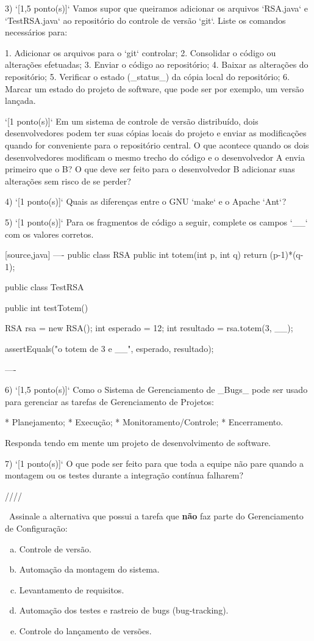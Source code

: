 3) `[1,5 ponto(s)]` Vamos supor que queiramos adicionar os arquivos
`RSA.java` e `TestRSA.java` ao repositório do controle de versão
`git`. Liste os comandos necessários para:

1. Adicionar os arquivos para o `git` controlar;
2. Consolidar o código ou alterações efetuadas;
3. Enviar o código ao repositório;
4. Baixar as alterações do repositório;
5. Verificar o estado (_status_) da cópia local do repositório;
6. Marcar um estado do projeto de software, que pode ser por exemplo,
   um versão lançada.


`[1 ponto(s)]` Em um sistema de controle de versão distribuído, dois
   desenvolvedores podem ter suas cópias locais do projeto e enviar
   as modificações quando for conveniente para o repositório central.
   O que acontece quando os dois desenvolvedores modificam o mesmo
   trecho do código e o desenvolvedor A envia primeiro que o B?
   O que deve ser feito para o desenvolvedor B adicionar suas
   alterações sem risco de se perder?

4) `[1 ponto(s)]` Quais as diferenças entre o GNU `make` e o Apache `Ant`?

5) `[1 ponto(s)]` Para os fragmentos de código a seguir, complete os campos
   `__` com os valores corretos.

[source,java]
----
public class RSA {
       public int totem(int p, int q) {
       	      return (p-1)*(q-1);
	}
}

public class TestRSA {
       public int testTotem() {
       	      RSA rsa = new RSA();
	      int esperado = 12;
	      int resultado = rsa.totem(3, __);

	      assertEquals("o totem de 3 e __", esperado, resultado);
       }
}
----

6) `[1,5 ponto(s)]` Como o Sistema de Gerenciamento de _Bugs_ pode ser usado
para gerenciar as tarefas de Gerenciamento de Projetos:

* Planejamento;
* Execução;
* Monitoramento/Controle;
* Encerramento.

Responda tendo em mente um projeto de desenvolvimento de software.

7) `[1 ponto(s)]` O que pode ser feito para que toda a equipe não pare quando a
montagem ou os testes durante a integração contínua falharem?

////

~Assinale a alternativa que possui a tarefa que {\bf não}
faz parte do Gerenciamento de Configuração:

\begin{enumerate}[a)]
\item Controle de versão.
\item Automação da montagem do sistema.
\item Levantamento de requisitos.
\item Automação dos testes e rastreio de bugs (bug-tracking).
\item Controle do lançamento de versões.
\end{enumerate}

